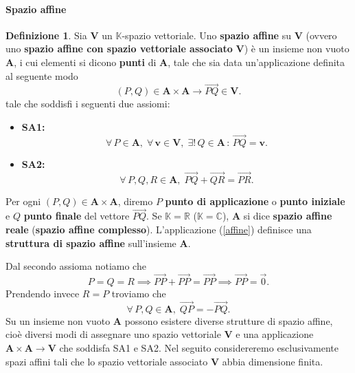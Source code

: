 \documentclass{article}
\theoremstyle{plain}
\theoremstyle{definition}
\newtheorem{defn}{Definizione}[section]
\theoremstyle{remark}
\begin{document}
\paragraph{Spazio affine}
\begin{bxthm}
\begin{defn}
    Sia $\mathbf{V}$ un $\mathbb{K}$-spazio vettoriale. Uno \textbf{spazio affine} su $\mathbf{V}$ (ovvero uno \textbf{spazio affine con spazio vettoriale associato} $\mathbf{V}$)
    è un insieme non vuoto $\mathbf{A}$, i cui elementi si dicono \textbf{punti} di $\mathbf{A}$, tale che sia data un'applicazione definita al seguente modo
    \begin{equation}\label{affine}
        (P,Q)\in\mathbf{A}\times\mathbf{A}\to\overrightarrow{PQ}\in\mathbf{V}.
    \end{equation}
    tale che soddisfi i seguenti due assiomi:
    \begin{itemize}
        \item \textbf{SA1: } \[\forall\,P\in\mathbf{A},\;\forall\,\mathbf{v}\in\mathbf{V},\;\exists!\,Q\in\mathbf{A}\,:\,\overrightarrow{PQ}=\mathbf{v}.\]
        \item \textbf{SA2: } \[\forall\,P,Q,R\in\mathbf{A},\;\overrightarrow{PQ}+\overrightarrow{QR}=\overrightarrow{PR}.\]
    \end{itemize}
    Per ogni $(P,Q)\in\mathbf{A}\times \mathbf{A}$, diremo $P$ \textbf{punto di applicazione} o \textbf{punto iniziale} e $Q$ \textbf{punto finale} del vettore $\overrightarrow{PQ}$.
    Se $\mathbb{K}=\mathbb{R}$ ($\mathbb{K}=\mathbb{C}$), $\mathbf{A}$ si dice \textbf{spazio affine reale} (\textbf{spazio affine complesso}).
    L'applicazione (\ref{affine}) definisce una \textbf{struttura di spazio affine} sull'insieme $\mathbf{A}$.
\end{defn}
\end{bxthm}

\vspace{10pt}

Dal secondo assioma notiamo che 
\[P=Q=R\implies \overrightarrow{PP} +\overrightarrow{PP}=\overrightarrow{PP}\implies \overrightarrow{PP}=\overrightarrow{0}.\]
Prendendo invece $R=P$ troviamo che \[\forall\,P,Q\in\mathbf{A},\;\overrightarrow{QP}=-\overrightarrow{PQ}.\]
Su un insieme non vuoto $\mathbf{A}$ possono esistere diverse strutture di spazio affine, cioè diversi modi 
di assegnare uno spazio vettoriale $\mathbf{V}$ e una applicazione $\mathbf{A}\times\mathbf{A}\to\mathbf{V}$ che soddisfa SA1 e SA2.
Nel seguito considereremo esclusivamente spazi affini tali che lo spazio vettoriale associato $\mathbf{V}$ abbia dimensione finita.
\end{document}

